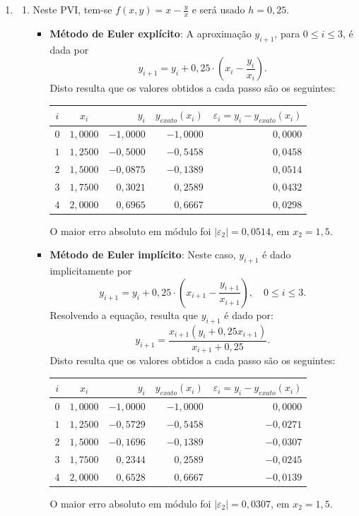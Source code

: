 \documentclass[12pt,a4paper]{article}
\begin{document}
\begin{enumerate}
\item \begin{enumerate}
\item Neste PVI, tem-se $f(x, y) = x - \frac{y}{x}$ e será usado $h = 0,25$.
\begin{itemize}
\item \textbf{Método de Euler explícito}: A aproximação $y_{i + 1}$, para $0 \leq i \leq 3$, é dada por
\[
y_{i + 1}
= y_{i} + 0,25 \cdot \left( x_i - \frac{y_i}{x_i} \right).
\]
Disto resulta que os valores obtidos a cada passo são os seguintes:

\medskip
\begin{center}
\begin{tabular}{ccrrr}
\hline
$i$ & $x_i$ & $y_i$ & $y_{exato}(x_i)$ & $\varepsilon_i = y_i-y_{exato}(x_i)$ \\ \hline
$0$ & $1,0000$ & $-1,0000$ & $-1,0000$ & $0,0000$ \\
$1$ & $1,2500$ & $-0,5000$ & $-0,5458$ & $0,0458$ \\
$2$ & $1,5000$ & $-0,0875$ & $-0,1389$ & $0,0514$ \\
$3$ & $1,7500$ & $ 0,3021$ & $ 0,2589$ & $0,0432$ \\
$4$ & $2,0000$ & $ 0,6965$ & $ 0,6667$ & $0,0298$ \\
\hline
\end{tabular}
\end{center}
\medskip
O maior erro absoluto em módulo foi $|\varepsilon_2| = 0,0514$, em $x_2 = 1,5$.

\item \textbf{Método de Euler implícito}: Neste caso, $y_{i + 1}$ é dado implicitamente por
\[
y_{i + 1}
= y_{i} + 0,25 \cdot \left( x_{i + 1} - \frac{y_{i + 1}}{x_{i + 1}} \right),
\quad 0 \leq i \leq 3.
\]
Resolvendo a equação, resulta que $y_{i + 1}$ é dado por:
\[
y_{i + 1}
= \frac{x_{i + 1} \left(y_{i} + 0,25 x_{i + 1}\right)}{ x_{i + 1} + 0,25 }.
\]
Disto resulta que os valores obtidos a cada passo são os seguintes:

\medskip
\begin{center}
\begin{tabular}{ccrrr}
\hline
$i$ & $x_i$ & $y_i$ & $y_{exato}(x_i)$ & $\varepsilon_i = y_i-y_{exato}(x_i)$ \\ \hline
$0$ & $1,0000$ & $-1,0000$ & $-1,0000$ & $ 0,0000$ \\
$1$ & $1,2500$ & $-0,5729$ & $-0,5458$ & $-0,0271$ \\
$2$ & $1,5000$ & $-0,1696$ & $-0,1389$ & $-0,0307$ \\
$3$ & $1,7500$ & $ 0,2344$ & $ 0,2589$ & $-0,0245$ \\
$4$ & $2,0000$ & $ 0,6528$ & $ 0,6667$ & $-0,0139$ \\
\hline
\end{tabular}
\end{center}
\medskip
O maior erro absoluto em módulo foi $|\varepsilon_2| = 0,0307$, em $x_2 = 1,5$.



\end{itemize}
\end{enumerate}
\end{enumerate}
\end{document}
